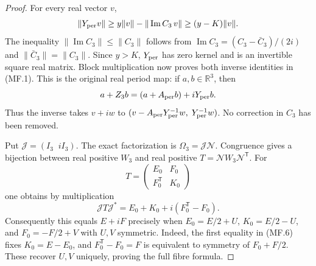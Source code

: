 \begin{proof}
For every real vector $v$,
\[
 \|Y_{\rm per}v\|
 \geq y\|v\|-\|\operatorname{Im}C_3\,v\|
 \geq(y-K)\|v\|.
\]
The inequality $\|\operatorname{Im}C_3\|\leq\|C_3\|$ follows from
$\operatorname{Im}C_3=(C_3-\bar C_3)/(2i)$ and
$\|\bar C_3\|=\|C_3\|$.  Since $y>K$, $Y_{\rm per}$ has zero kernel
and is an invertible square real matrix.  Block multiplication now proves
both inverse identities in (MF.1).  This is the original real period map:
if $a,b\in\mathbb R^3$, then
\[
 a+Z_3b=(a+A_{\rm per}b)+iY_{\rm per}b.
\]
Thus the inverse takes $v+iw$ to
$(v-A_{\rm per}Y_{\rm per}^{-1}w,\;Y_{\rm per}^{-1}w)$.
No correction in $C_3$ has been removed.

Put $\mathcal J=(I_3\;\;iI_3)$.  The exact factorization is
$\Omega_3=\mathcal J\mathcal N$.  Congruence gives a bijection between
real positive $W_3$ and real positive
$T=\mathcal NW_3\mathcal N^{\mathsf T}$.  For
\[
 T=\begin{pmatrix}E_0&F_0\\F_0^{\mathsf T}&K_0\end{pmatrix}
\]
one obtains by multiplication
\[
 \mathcal JT\mathcal J^*
   =E_0+K_0+i(F_0^{\mathsf T}-F_0).                            \tag{MF.6}
\]
Consequently this equals $E+iF$ precisely when
$E_0=E/2+U$, $K_0=E/2-U$, and $F_0=-F/2+V$ with $U,V$ symmetric.
Indeed, the first equality in (MF.6) fixes $K_0=E-E_0$,
and $F_0^{\mathsf T}-F_0=F$ is equivalent to symmetry of $F_0+F/2$.
These recover $U,V$ uniquely, proving the full fibre formula.


\end{proof}
